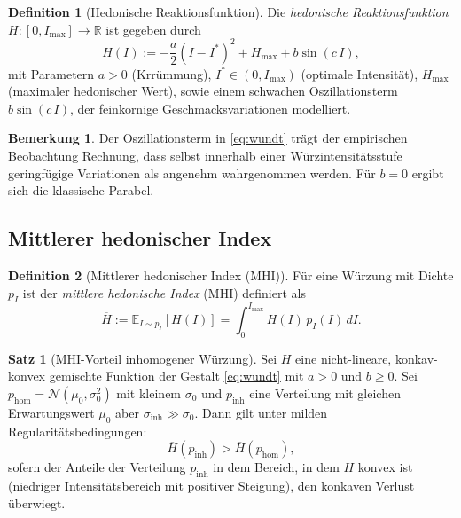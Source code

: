 ﻿\documentclass[12pt,a4paper]{article}
\theoremstyle{definition}
\newtheorem{definition}{Definition}[section]
\newtheorem{theorem}{Satz}[section]
\newtheorem{remark}{Bemerkung}[section]
\newcommand{\R}{\mathbb{R}}
\newcommand{\E}{\mathbb{E}}
\newcommand{\MHI}{\overline{H}}
\begin{document}
\begin{definition}[Hedonische Reaktionsfunktion]
Die \emph{hedonische Reaktionsfunktion} $H: [0, I_{\max}] \to \R$ ist
gegeben durch
\begin{equation}
  H(I) := -\frac{a}{2}(I - I^*)^2 + H_{\max} + b\sin(c\, I),
  \label{eq:wundt}
\end{equation}
mit Parametern $a > 0$ (Krrümmung), $I^* \in (0, I_{\max})$ (optimale
Intensität), $H_{\max}$ (maximaler hedonischer Wert), sowie einem
schwachen Oszillationsterm $b\sin(c\, I)$, der feinkornige
Geschmacksvariationen modelliert.
\end{definition}

\begin{remark}
Der Oszillationsterm in \eqref{eq:wundt} trägt der empirischen
Beobachtung Rechnung, dass selbst innerhalb einer Würzintensitätsstufe
geringfügige Variationen als angenehm wahrgenommen werden. Für
$b = 0$ ergibt sich die klassische Parabel.
\end{remark}

\subsection{Mittlerer hedonischer Index}

\begin{definition}[Mittlerer hedonischer Index (MHI)]
Für eine Würzung mit Dichte $p_I$ ist der \emph{mittlere hedonische
Index} (MHI) definiert als
\begin{equation}
  \MHI := \E_{I \sim p_I}[H(I)] = \int_0^{I_{\max}} H(I)\, p_I(I)\, dI.
  \label{eq:mhi}
\end{equation}
\end{definition}

\begin{theorem}[MHI-Vorteil inhomogener Würzung]\label{thm:mhivorteil}
Sei $H$ eine nicht-lineare, konkav-konvex gemischte Funktion der
Gestalt \eqref{eq:wundt} mit $a > 0$ und $b \geq 0$.
Sei $p_{\mathrm{hom}} = \mathcal{N}(\mu_0, \sigma_0^2)$ mit kleinem
$\sigma_0$ und $p_{\mathrm{inh}}$ eine Verteilung mit gleichen
Erwartungswert $\mu_0$ aber $\sigma_{\mathrm{inh}} \gg \sigma_0$.
Dann gilt unter milden Regularitätsbedingungen:
\[
  \MHI(p_{\mathrm{inh}}) > \MHI(p_{\mathrm{hom}}),
\]
sofern der Anteile der Verteilung $p_{\mathrm{inh}}$ in dem Bereich, in dem
$H$ konvex ist (niedriger Intensitätsbereich mit positiver Steigung), den
konkaven Verlust überwiegt.
\end{theorem}
\end{document}
